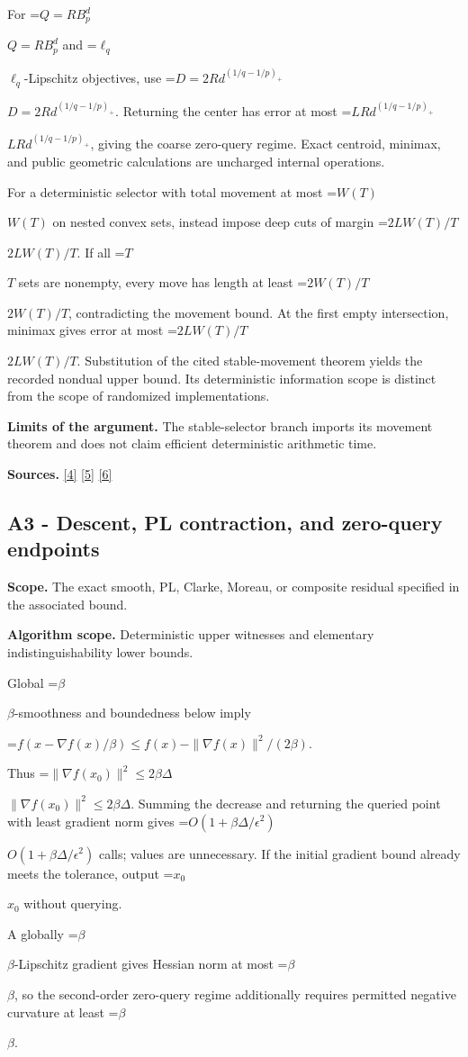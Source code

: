 \documentclass[10pt,a4paper]{article}
\newcommand{\AtlasMath}[1]{\par\begingroup\centering\setbox0=\hbox{$\displaystyle #1$}\ifdim\wd0>1.4\linewidth\typeout{ATLAS WIDE FORMULA: \the\wd0}\fi\ifdim\wd0>\linewidth\resizebox{\linewidth}{!}{\box0}\else\box0\fi\par\endgroup}
\newcommand{\AtlasInlineMath}[1]{\begingroup\setbox0=\hbox{$#1$}\ifdim\wd0>.4\linewidth\endgroup\AtlasMath{#1}\else\endgroup$#1$\fi}
\begin{document}
For \AtlasInlineMath{Q=RB_p^d} and \AtlasInlineMath{\ell_q}-Lipschitz objectives, use \AtlasInlineMath{D=2Rd^{(1/q-1/p)_+}}. Returning the center has error at most \AtlasInlineMath{LRd^{(1/q-1/p)_+}}, giving the coarse zero-query regime. Exact centroid, minimax, and public geometric calculations are uncharged internal operations.

For a deterministic selector with total movement at most \AtlasInlineMath{W(T)} on nested convex sets, instead impose deep cuts of margin \AtlasInlineMath{2LW(T)/T}. If all \AtlasInlineMath{T} sets are nonempty, every move has length at least \AtlasInlineMath{2W(T)/T}, contradicting the movement bound. At the first empty intersection, minimax gives error at most \AtlasInlineMath{2LW(T)/T}. Substitution of the cited stable-movement theorem yields the recorded nondual upper bound. Its deterministic information scope is distinct from the scope of randomized implementations.

\textbf{Limits of the argument.} The stable-selector branch imports its movement theorem and does not claim efficient deterministic arithmetic time.

\textbf{Sources.} \href{https://arxiv.org/pdf/1405.4980}{[4]} \href{https://www2.isye.gatech.edu/~nemirovs/MOR_AccuracyCertificates.pdf}{[5]} \href{https://arxiv.org/pdf/2609.20701}{[6]}

\subsection{A3 - Descent, PL contraction, and zero-query endpoints}
\textbf{Scope.} The exact smooth, PL, Clarke, Moreau, or composite residual specified in the associated bound.

\textbf{Algorithm scope.} Deterministic upper witnesses and elementary indistinguishability lower bounds.

Global \AtlasInlineMath{\beta}-smoothness and boundedness below imply

\AtlasMath{f(x-\nabla f(x)/\beta)\le f(x)-\|\nabla f(x)\|^2/(2\beta).}

Thus \AtlasInlineMath{\|\nabla f(x_0)\|^2\le2\beta\Delta}. Summing the decrease and returning the queried point with least gradient norm gives \AtlasInlineMath{O(1+\beta\Delta/\epsilon^2)} calls; values are unnecessary. If the initial gradient bound already meets the tolerance, output \AtlasInlineMath{x_0} without querying.

A globally \AtlasInlineMath{\beta}-Lipschitz gradient gives Hessian norm at most \AtlasInlineMath{\beta}, so the second-order zero-query regime additionally requires permitted negative curvature at least \AtlasInlineMath{\beta}.
\end{document}

